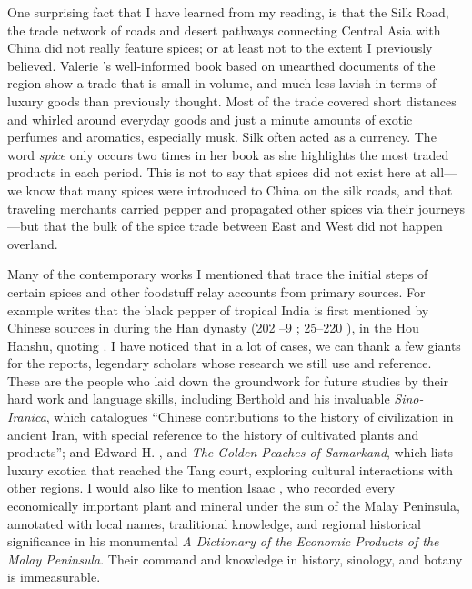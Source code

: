 One surprising fact that I have learned from my reading, is that the Silk Road, the trade network of roads and desert pathways connecting Central Asia with China did not really feature spices; or at least not to the extent I previously believed. Valerie \textcite{hansen_silk_2012}'s well-informed book based on unearthed documents of the region show a trade that is small in volume, and much less lavish in terms of luxury goods than previously thought. Most of the trade covered short distances and whirled around everyday goods and just a minute amounts of exotic perfumes and aromatics, especially musk. Silk often acted as a currency. The word \textit{spice} only occurs two times in her book as she highlights the most traded products in each period. This is not to say that spices did not exist here at all---we know that many spices were introduced to China on the silk roads, and that traveling merchants carried pepper and propagated other spices via their journeys---but that the bulk of the spice trade between East and West did not happen overland.


Many of the contemporary works I mentioned that trace the initial steps of certain spices and other foodstuff relay accounts from primary sources. For example \textcite{spengler_spices_2019} writes that the black pepper of tropical India is first mentioned by Chinese sources in during the Han dynasty (202 \BC{}--9 \AD{}; 25--220 \AD{}), in the \gls{Hou Hanshu}, quoting \textcite[374]{laufer_sino-iranica_1919}. I have noticed that in a lot of cases, we can thank a few giants for the reports, legendary scholars whose research we still use and reference. These are the people who laid down the groundwork for future studies by their hard work and language skills, including Berthold \textcite{laufer_sino-iranica_1919} and his invaluable \textit{Sino-Iranica}, which catalogues ``Chinese contributions to the history of civilization in ancient Iran, with special reference to the history of cultivated plants and products''; and Edward H. \textcite{schafer_golden_1985}, and \textit{The Golden Peaches of Samarkand}, which lists luxury exotica that reached the Tang court, exploring cultural interactions with other regions. I would also like to mention Isaac \textcite{burkill_dictionary_1935}, who recorded every economically important plant and mineral under the sun of the Malay Peninsula, annotated with local names, traditional knowledge, and regional historical significance in his monumental \textit{A Dictionary of the Economic Products of the Malay Peninsula}. Their command and knowledge in history, sinology, and botany is immeasurable.

